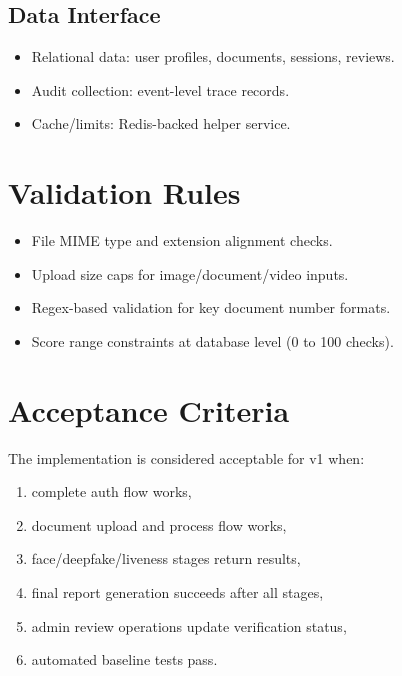 \subsection{Data Interface}
\begin{itemize}
\item Relational data: user profiles, documents, sessions, reviews.
\item Audit collection: event-level trace records.
\item Cache/limits: Redis-backed helper service.
\end{itemize}

\section{Validation Rules}
\begin{itemize}
\item File MIME type and extension alignment checks.
\item Upload size caps for image/document/video inputs.
\item Regex-based validation for key document number formats.
\item Score range constraints at database level (0 to 100 checks).
\end{itemize}

\section{Acceptance Criteria}
The implementation is considered acceptable for v1 when:
\begin{enumerate}
\item complete auth flow works,
\item document upload and process flow works,
\item face/deepfake/liveness stages return results,
\item final report generation succeeds after all stages,
\item admin review operations update verification status,
\item automated baseline tests pass.
\end{enumerate}
